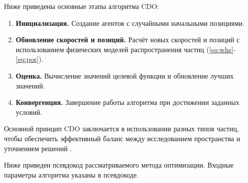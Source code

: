 \documentclass[10pt]{article}
\begin{document}
Ниже приведены основные этапы алгоритма CDO:

\begin{enumerate}
    \item \textbf{Инициализация.} Создание агентов с случайными начальными позициями.
    \item \textbf{Обновление скоростей и позиций.} Расчёт новых скоростей и позиций с использованием физических моделей распространения частиц (\ref{eq:whs}-\ref{eq:pos}).
    \item \textbf{Оценка.} Вычисление значений целевой функции и обновление лучших значений.
    \item \textbf{Конвергенция.} Завершение работы алгоритма при достижении заданных условий.
\end{enumerate}

Основной принцип CDO заключается в использовании разных типов частиц, чтобы обеспечить эффективный баланс между исследованием пространства и уточнением решений .

Ниже приведен псевдокод рассматриваемого метода оптимизации. Входные параметры алгоритма указаны в псевдокоде. 
\end{document}
